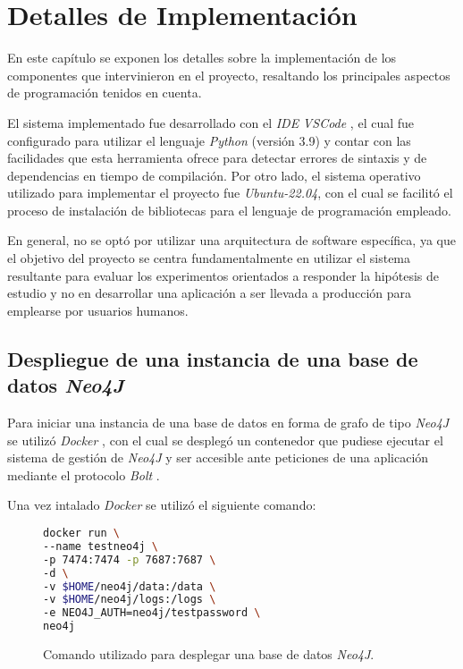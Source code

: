 \chapter{Detalles de Implementación}\label{chapter: implementation}

En este capítulo se exponen los detalles sobre la implementación de los componentes que intervinieron en el proyecto, resaltando los principales aspectos de programación tenidos en cuenta.

El sistema implementado fue desarrollado con el \textit{IDE} \textit{VSCode} \cite{vscode}, el cual fue configurado para utilizar el lenguaje \textit{Python} (versión 3.9) \cite{python} y contar con las facilidades que esta herramienta ofrece para detectar errores de sintaxis y de dependencias en tiempo de compilación. Por otro lado, el sistema operativo utilizado para implementar el proyecto fue \textit{Ubuntu-22.04}, con el cual se facilitó el proceso de instalación de bibliotecas para el lenguaje de programación empleado.

En general, no se optó por utilizar una arquitectura de software específica, ya que el objetivo del proyecto se centra fundamentalmente en utilizar el sistema resultante para evaluar los experimentos orientados a responder la hipótesis de estudio y no en desarrollar una aplicación a ser llevada a producción para emplearse por usuarios humanos.

\section{Despliegue de una instancia de una base de datos \textit{Neo4J}}

Para iniciar una instancia de una base de datos en forma de grafo de tipo \textit{Neo4J} se utilizó \textit{Docker} \cite{docker}, con el cual se desplegó un contenedor que pudiese ejecutar el sistema de gestión de \textit{Neo4J} y ser accesible ante peticiones de una aplicación mediante el protocolo \textit{Bolt} \cite{boltprotocol}.

Una vez intalado \textit{Docker} se utilizó el siguiente comando:

\begin{figure}[H]
\begin{lstlisting}[language=bash]
 docker run \
--name testneo4j \
-p 7474:7474 -p 7687:7687 \
-d \
-v $HOME/neo4j/data:/data \
-v $HOME/neo4j/logs:/logs \
-e NEO4J_AUTH=neo4j/testpassword \
neo4j
\end{lstlisting}
\caption{Comando utilizado para desplegar una base de datos \textit{Neo4J}.}
\end{figure}

